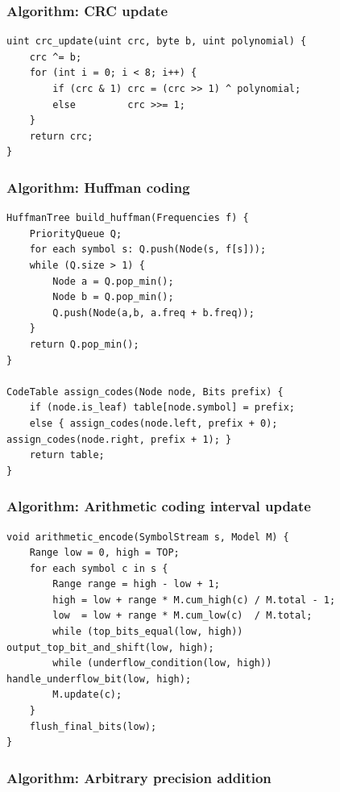 \documentclass[11pt]{article}
\begin{document}
\subsubsection{Algorithm: CRC update}\label{algorithm-crc-update}

\begin{verbatim}
uint crc_update(uint crc, byte b, uint polynomial) {
    crc ^= b;
    for (int i = 0; i < 8; i++) {
        if (crc & 1) crc = (crc >> 1) ^ polynomial;
        else         crc >>= 1;
    }
    return crc;
}
\end{verbatim}

\subsubsection{Algorithm: Huffman coding}\label{algorithm-huffman-coding}

\begin{verbatim}
HuffmanTree build_huffman(Frequencies f) {
    PriorityQueue Q;
    for each symbol s: Q.push(Node(s, f[s]));
    while (Q.size > 1) {
        Node a = Q.pop_min();
        Node b = Q.pop_min();
        Q.push(Node(a,b, a.freq + b.freq));
    }
    return Q.pop_min();
}

CodeTable assign_codes(Node node, Bits prefix) {
    if (node.is_leaf) table[node.symbol] = prefix;
    else { assign_codes(node.left, prefix + 0); assign_codes(node.right, prefix + 1); }
    return table;
}
\end{verbatim}

\subsubsection{Algorithm: Arithmetic coding interval update}\label{algorithm-arithmetic-coding-interval-update}

\begin{verbatim}
void arithmetic_encode(SymbolStream s, Model M) {
    Range low = 0, high = TOP;
    for each symbol c in s {
        Range range = high - low + 1;
        high = low + range * M.cum_high(c) / M.total - 1;
        low  = low + range * M.cum_low(c)  / M.total;
        while (top_bits_equal(low, high)) output_top_bit_and_shift(low, high);
        while (underflow_condition(low, high)) handle_underflow_bit(low, high);
        M.update(c);
    }
    flush_final_bits(low);
}
\end{verbatim}

\subsubsection{Algorithm: Arbitrary precision addition}\label{algorithm-arbitrary-precision-addition}
\end{document}
